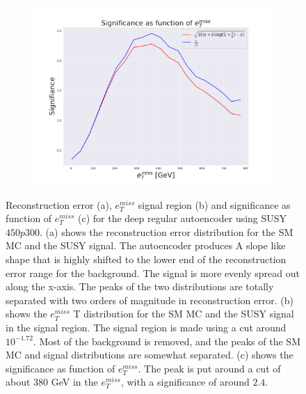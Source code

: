 \begin{figure}[H]
    \hfill  
    \begin{subfigure}{.49\textwidth}
        \includegraphics[width=\textwidth]{Figures/AE_testing/small/2lep/significance_etmiss_450p0p0300_-1.7167506533614734.pdf}
        \caption{}
        \label{fig:AE_2lep_small_signi_450}
    \end{subfigure}
    \hfill      
    \caption[2lep shallow network | $450p300$ | AE]{Reconstruction error (a), $e_T^{miss}$ signal region (b) and significance as function of 
    $e_T^{miss}$ (c) for the deep regular autoencoder using SUSY $450p300$. 
    (a) shows the reconstruction error distribution for the SM MC and the SUSY signal. 
    The autoencoder produces A slope like shape that is highly shifted to the lower end of the reconstruction error range
for the background. The signal is more evenly spread out along the x-axis. The peaks of the two distributions are totally separated
with two orders of magnitude in reconstruction error. (b) shows the $e_T^{miss}$
T distribution for the SM MC and the SUSY signal in the signal region. The signal region is made using a cut around
$10^{-1.72}$. Most of the background is removed, and the peaks of the SM MC and signal distributions are
somewhat separated. (c) shows the significance as function of $e_T^{miss}$. The peak is put 
around a cut of about 380 GeV in the $e_T^{miss}$, with a significance of around $2.4$.}
    \label{fig:AE_2lep_small_rec_sig_signi_450}
\end{figure}


